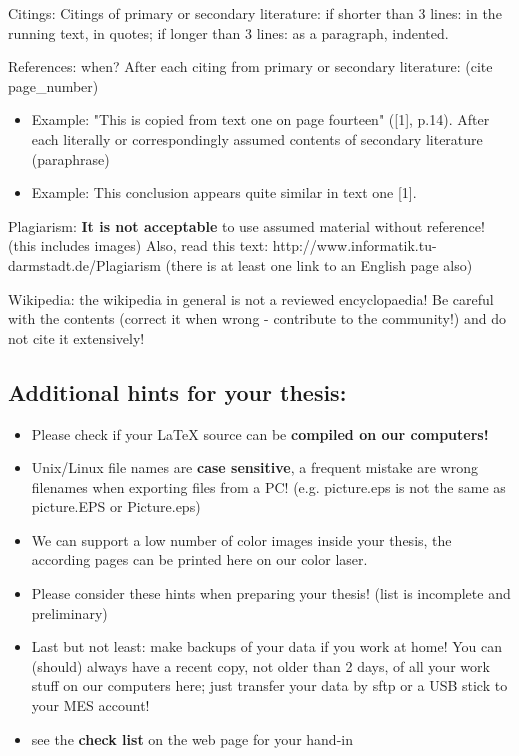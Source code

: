 \begin{description}
\item{Citings:} Citings of primary or secondary literature:
if shorter than 3 lines: in the running text, in quotes;
if longer than 3 lines: as a paragraph, indented.
\item{References:} when?
After each citing from primary or secondary literature: (cite page\_number)
\begin{itemize}
\item Example: "This is copied from text one on page fourteen" ([1], p.14).
After each literally or correspondingly assumed contents of secondary literature (paraphrase)
\item Example: This conclusion appears quite similar in text one [1].
\end{itemize}
\item{Plagiarism:}
{\bf It is not acceptable} to use assumed material without reference! (this includes images)
Also, read this text: http://www.informatik.tu-darmstadt.de/Plagiarism (there is at least one link to an English page also)
\item{Wikipedia:} the wikipedia in general is not a reviewed encyclopaedia! Be careful with the contents (correct it when wrong - contribute to the community!) and do not cite it extensively!
\end{description}

\subsection{Additional hints for your thesis:}

\begin{itemize}
\item Please check if your LaTeX source can be {\bf compiled on our  computers!}
\item Unix/Linux file names are {\bf case sensitive}, a frequent mistake are wrong filenames when exporting files from a PC!
(e.g. picture.eps is not the same as picture.EPS or Picture.eps)
\item We can support a low number of color images inside your thesis, the according pages can be printed here on our color laser.
\item Please consider these hints when preparing your thesis! (list is incomplete and preliminary)
\item Last but not least: make backups of your data if you work at home!
You can (should) always have a recent copy, not older than 2 days, of all your work stuff on our computers here; just transfer your data by sftp or a USB stick to your MES account!
\item see the {\bf check list} on the web page for your hand-in
\end{itemize}

